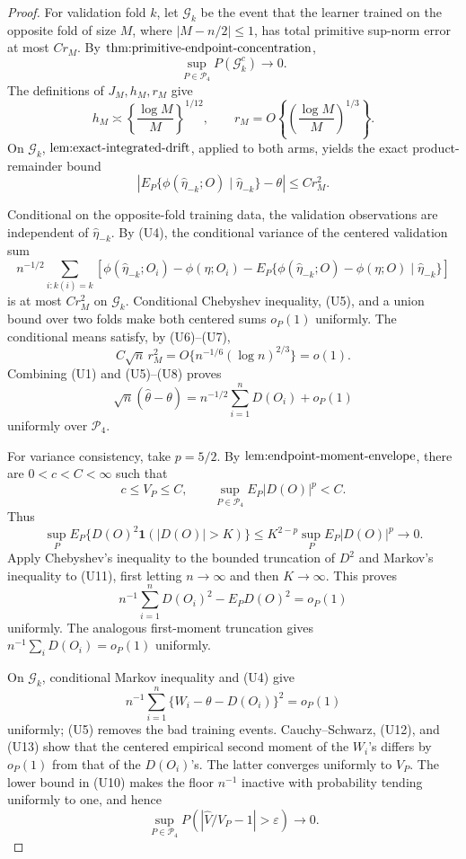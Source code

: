 \documentclass{article}
\begin{document}
\begin{proof}
For validation fold \(k\), let \(\mathcal G_k\) be the event that the learner trained on the opposite fold of size \(M\), where \(|M-n/2|\le1\), has total primitive sup-norm error at most \(Cr_M\).  By \(\textnormal{thm:primitive-endpoint-concentration}\),
\[
 \sup_{P\in\mathcal P_4}P(\mathcal G_k^c)\longrightarrow0.            \tag{U5}
\]
The definitions of \(J_M,h_M,r_M\) give
\[
 h_M\asymp\left\{\frac{\log M}{M}\right\}^{1/12},
 \qquad r_M=O\!\left\{\left(\frac{\log M}{M}\right)^{1/3}\right\}. \tag{U6}
\]
On \(\mathcal G_k\), \(\textnormal{lem:exact-integrated-drift}\), applied to both arms, yields the exact product-remainder bound
\[
 \left|E_P\{\phi(\widehat\eta_{-k};O)\mid\widehat\eta_{-k}\}-\theta\right|
 \le Cr_M^2.                                                           \tag{U7}
\]

Conditional on the opposite-fold training data, the validation observations are independent of \(\widehat\eta_{-k}\).  By (U4), the conditional variance of the centered validation sum
\[
 n^{-1/2}\sum_{i:k(i)=k}\left[
 \phi(\widehat\eta_{-k};O_i)-\phi(\eta;O_i)
 -E_P\{\phi(\widehat\eta_{-k};O)-\phi(\eta;O)\mid\widehat\eta_{-k}\}
 \right]
\]
is at most \(Cr_M^2\) on \(\mathcal G_k\).  Conditional Chebyshev inequality, (U5), and a union bound over two folds make both centered sums \(o_P(1)\) uniformly.  The conditional means satisfy, by (U6)--(U7),
\[
 C\sqrt n\,r_M^2=O\{n^{-1/6}(\log n)^{2/3}\}=o(1).                    \tag{U8}
\]
Combining (U1) and (U5)--(U8) proves
\[
 \sqrt n(\widehat\theta-\theta)
 =n^{-1/2}\sum_{i=1}^nD(O_i)+o_P(1)                                   \tag{U9}
\]
uniformly over \(\mathcal P_4\).

For variance consistency, take \(p=5/2\).  By \(\textnormal{lem:endpoint-moment-envelope}\), there are \(0<c<C<\infty\) such that
\[
 c\le V_P\le C,\qquad \sup_{P\in\mathcal P_4}E_P|D(O)|^p<C.          \tag{U10}
\]
Thus
\[
 \sup_P E_P\{D(O)^2\mathbf 1(|D(O)|>K)\}
 \le K^{2-p}\sup_PE_P|D(O)|^p\longrightarrow0.                       \tag{U11}
\]
Apply Chebyshev's inequality to the bounded truncation of \(D^2\) and Markov's inequality to (U11), first letting \(n\to\infty\) and then \(K\to\infty\).  This proves
\[
 n^{-1}\sum_{i=1}^nD(O_i)^2-E_PD(O)^2=o_P(1)                           \tag{U12}
\]
uniformly.  The analogous first-moment truncation gives \(n^{-1}\sum_iD(O_i)=o_P(1)\) uniformly.

On \(\mathcal G_k\), conditional Markov inequality and (U4) give
\[
 n^{-1}\sum_{i=1}^n\{W_i-\theta-D(O_i)\}^2=o_P(1)                    \tag{U13}
\]
uniformly; (U5) removes the bad training events.  Cauchy--Schwarz, (U12), and (U13) show that the centered empirical second moment of the \(W_i\)'s differs by \(o_P(1)\) from that of the \(D(O_i)\)'s.  The latter converges uniformly to \(V_P\).  The lower bound in (U10) makes the floor \(n^{-1}\) inactive with probability tending uniformly to one, and hence
\[
 \sup_{P\in\mathcal P_4}P\!\left(\left|\widehat V/V_P-1\right|>\varepsilon\right)
 \longrightarrow0.                                                    \tag{U14}
\]


\end{proof}
\end{document}
